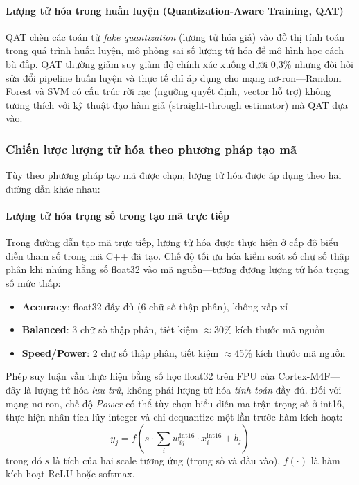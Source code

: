 \paragraph{Lượng tử hóa trong huấn luyện (Quantization-Aware Training, QAT)}
QAT chèn các toán tử \textit{fake quantization} (lượng tử hóa giả) vào đồ thị tính toán trong quá trình huấn luyện, mô phỏng sai số lượng tử hóa để mô hình học cách bù đắp. QAT thường giảm suy giảm độ chính xác xuống dưới 0,3\% nhưng đòi hỏi sửa đổi pipeline huấn luyện và thực tế chỉ áp dụng cho mạng nơ-ron---Random Forest và SVM có cấu trúc rời rạc (ngưỡng quyết định, vector hỗ trợ) không tương thích với kỹ thuật đạo hàm giả (straight-through estimator) mà QAT dựa vào.

\subsubsection{Chiến lược lượng tử hóa theo phương pháp tạo mã}

Tùy theo phương pháp tạo mã được chọn, lượng tử hóa được áp dụng theo hai đường dẫn khác nhau:

\paragraph{Lượng tử hóa trọng số trong tạo mã trực tiếp}
Trong đường dẫn tạo mã trực tiếp, lượng tử hóa được thực hiện ở cấp độ biểu diễn tham số trong mã C++ đã tạo. Chế độ tối ưu hóa kiểm soát số chữ số thập phân khi nhúng hằng số float32 vào mã nguồn---tương đương lượng tử hóa trọng số mức thấp:
\begin{itemize}
    \item \textbf{Accuracy}: float32 đầy đủ (6 chữ số thập phân), không xấp xỉ
    \item \textbf{Balanced}: 3 chữ số thập phân, tiết kiệm $\approx$30\% kích thước mã nguồn
    \item \textbf{Speed/Power}: 2 chữ số thập phân, tiết kiệm $\approx$45\% kích thước mã nguồn
\end{itemize}
Phép suy luận vẫn thực hiện bằng số học float32 trên FPU của Cortex-M4F---đây là lượng tử hóa \textit{lưu trữ}, không phải lượng tử hóa \textit{tính toán} đầy đủ. Đối với mạng nơ-ron, chế độ \textit{Power} có thể tùy chọn biểu diễn ma trận trọng số ở int16, thực hiện nhân tích lũy integer và chỉ dequantize một lần trước hàm kích hoạt:
\begin{equation}
    y_j = f\!\left(s \cdot \sum_i w_{ij}^{\mathrm{int16}} \cdot x_i^{\mathrm{int16}} + b_j\right)
\end{equation}
trong đó $s$ là tích của hai scale tương ứng (trọng số và đầu vào), $f(\cdot)$ là hàm kích hoạt ReLU hoặc softmax.

